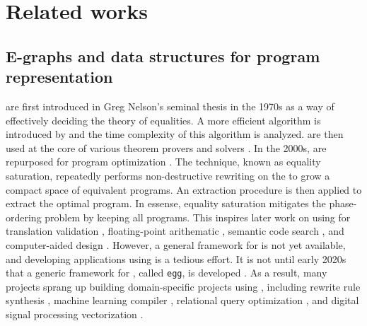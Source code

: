 \chapter{Related works}

\section{E-graphs and data structures for program representation}

\Egraphs are first introduced in Greg Nelson's seminal thesis \citep{nelson-thesis}
 in the 1970s 
 as a way of effectively deciding the theory of equalities.
A more efficient algorithm is introduced by \citet{tarjan-congruence} 
 and the time complexity of this algorithm is analyzed.
\Egraphs are then used at the core of 
 various theorem provers and solvers \citep{simplify, z3, cvc4}.
In the 2000s, 
 \egraphs are repurposed for program optimization \citet{eqsat,denali}.
The technique, known as equality saturation, 
 repeatedly performs non-destructive rewriting on the \egraphs 
 to grow a compact space of equivalent programs.
An extraction procedure is then applied to extract the optimal program.
In essense, equality saturation mitigates the phase-ordering problem by keeping 
 all programs.
This inspires later work on using \egraphs for
 translation validation \citep{eqsat-tv}, 
 floating-point arithematic \citep{herbie},
 semantic code search \citep{semsearch},
 and computer-aided design \citep{carpentry-compiler}.
However, a general framework for \egraphs is not yet available,
 and developing applications using \egraphs is a tedious effort.
It is not until early 2020s that a generic framework for \egraphs, 
 called \texttt{egg}, is developed \citep{egg}.
As a result, many projects sprang up building domain-specific projects using \egraphs,
 including rewrite rule synthesis \citep{ruler}, machine learning compiler \citep{tensat,glenside},
 relational query optimization \citep{spores}, and
 digital signal processing vectorization \citep{diospyros}.



